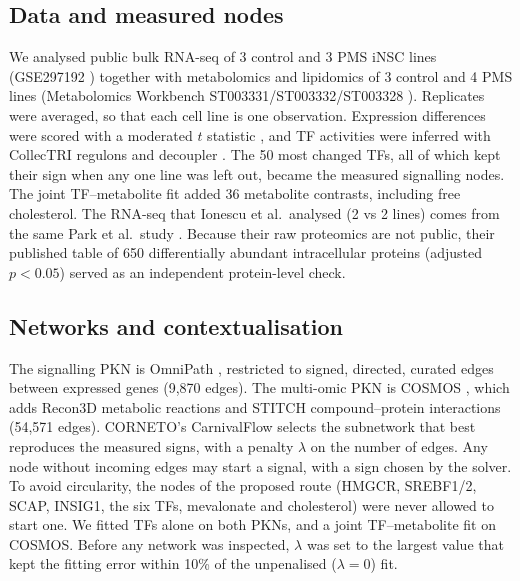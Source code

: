 \documentclass[11pt, a4paper]{article}
\begin{document}
\subsection{Data and measured nodes}
We analysed public bulk RNA-seq of 3 control and 3 PMS iNSC lines (GSE297192
\cite{park2025,barrett2013geo}) together with metabolomics and lipidomics of 3 control and 4 PMS
lines (Metabolomics Workbench ST003331/ST003332/ST003328 \cite{ionescu2024,sud2016mw}). Replicates
were averaged, so that each cell line is one observation. Expression differences were scored with
a moderated $t$ statistic \cite{smyth2004limma}, and TF activities were inferred with CollecTRI
regulons and decoupler \cite{mullerdott2023collectri,badia2022decoupler}. The 50 most changed TFs,
all of which kept their sign when any one line was left out, became the measured signalling nodes.
The joint TF--metabolite fit added 36 metabolite contrasts, including free cholesterol. The RNA-seq that
Ionescu et al.\ analysed (2 vs 2 lines) comes from the same Park et al.\ study \cite{park2025}.
Because their raw proteomics are not public, their published table of 650 differentially abundant
intracellular proteins (adjusted $p<0.05$) served as an independent protein-level check.

\subsection{Networks and contextualisation}
The signalling PKN is OmniPath \cite{turei2021omnipath}, restricted to signed, directed, curated
edges between expressed genes (9,870 edges). The multi-omic PKN is COSMOS \cite{dugourd2021cosmos},
which adds Recon3D metabolic reactions \cite{brunk2018recon3d} and STITCH compound--protein
interactions \cite{szklarczyk2016stitch} (54,571 edges). CORNETO's CarnivalFlow selects the
subnetwork that best reproduces the measured signs, with a penalty $\lambda$ on the number of
edges. Any node without incoming edges may start a signal, with a sign chosen by the solver. To
avoid circularity, the nodes of the proposed route (HMGCR, SREBF1/2, SCAP, INSIG1, the six TFs,
mevalonate and cholesterol) were never allowed to start one. We fitted TFs alone on both PKNs, and a
joint TF--metabolite fit on COSMOS. Before any network was inspected, $\lambda$ was set to the largest
value that kept the fitting error within 10\% of the unpenalised ($\lambda=0$) fit.
\end{document}
